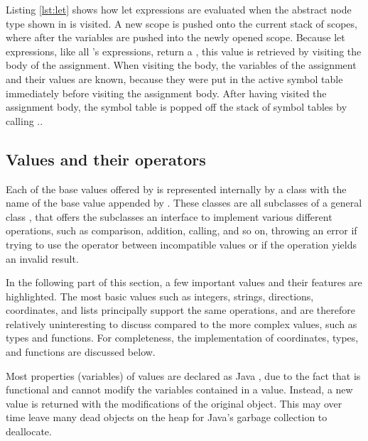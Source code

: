 

Listing \ref{lst:let} shows how let expressions are evaluated
when the abstract node type shown in  is
visited. A new scope is pushed onto the current stack of scopes,
where after the variables are pushed into the newly opened scope. 
Because let expressions, like all \productname{}'s
expressions, return a , this value is retrieved by visiting 
the body of the assignment. When visiting the body, the variables of the assignment and their values 
are known, because they were put in the active symbol table immediately before visiting the assignment body.
After having visited the assignment body, the symbol table is popped off the stack of 
symbol tables by calling ..

\subsection{Values and their operators}
\label{sec:valuesandtheiroperators}
Each of the base values offered by \productname{} is represented
internally by a class with the name of the base value appended by . 
These classes are all subclasses of a general class , that offers the
subclasses an interface to implement various different operations, such
as comparison, addition, calling, and so on, throwing an error if trying
to use the operator between incompatible values or if the operation
yields an invalid result.

In the following part of this section, a few important values and their
features are highlighted. The most basic values such as integers,
strings, directions, coordinates, and lists principally support the
same operations, and are therefore relatively uninteresting to discuss
compared to the more complex values, such as types and functions. For
completeness, the implementation of coordinates, types, and
functions are discussed below.

Most properties (variables) of values are declared as Java
, due to the fact that \productname{} is functional and cannot 
modify the variables contained in a value. Instead, a new value is returned with the 
modifications of the original object. This may over time leave many dead
objects on the heap for Java's garbage collection to deallocate.

